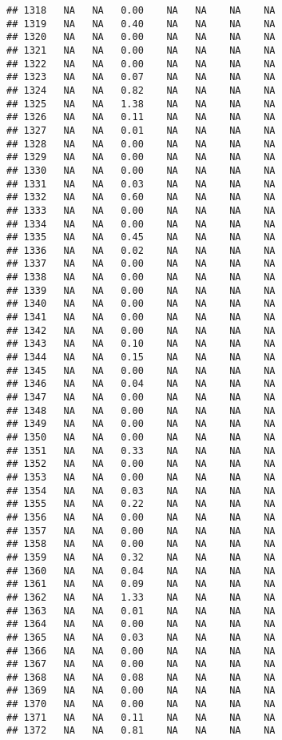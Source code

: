 \documentclass{article}\usepackage{graphicx, color}
\makeatletter
\newenvironment{kframe}{%
 \def\at@end@of@kframe{}%
 \ifinner\ifhmode%
  \def\at@end@of@kframe{\end{minipage}}%
  \begin{minipage}{\columnwidth}%
 \fi\fi%
 \def\FrameCommand##1{\hskip\@totalleftmargin \hskip-\fboxsep
 \colorbox{shadecolor}{##1}\hskip-\fboxsep
     \hskip-\linewidth \hskip-\@totalleftmargin \hskip\columnwidth}%
 \MakeFramed {\advance\hsize-\width
   \@totalleftmargin\z@ \linewidth\hsize
   \@setminipage}}%
 {\par\unskip\endMakeFramed%
 \at@end@of@kframe}
\newenvironment{knitrout}{}{} %
\makeatother
\begin{document}
\begin{knitrout}
\begin{kframe}
\begin{verbatim}
## 1318   NA   NA   0.00    NA   NA    NA    NA
## 1319   NA   NA   0.40    NA   NA    NA    NA
## 1320   NA   NA   0.00    NA   NA    NA    NA
## 1321   NA   NA   0.00    NA   NA    NA    NA
## 1322   NA   NA   0.00    NA   NA    NA    NA
## 1323   NA   NA   0.07    NA   NA    NA    NA
## 1324   NA   NA   0.82    NA   NA    NA    NA
## 1325   NA   NA   1.38    NA   NA    NA    NA
## 1326   NA   NA   0.11    NA   NA    NA    NA
## 1327   NA   NA   0.01    NA   NA    NA    NA
## 1328   NA   NA   0.00    NA   NA    NA    NA
## 1329   NA   NA   0.00    NA   NA    NA    NA
## 1330   NA   NA   0.00    NA   NA    NA    NA
## 1331   NA   NA   0.03    NA   NA    NA    NA
## 1332   NA   NA   0.60    NA   NA    NA    NA
## 1333   NA   NA   0.00    NA   NA    NA    NA
## 1334   NA   NA   0.00    NA   NA    NA    NA
## 1335   NA   NA   0.45    NA   NA    NA    NA
## 1336   NA   NA   0.02    NA   NA    NA    NA
## 1337   NA   NA   0.00    NA   NA    NA    NA
## 1338   NA   NA   0.00    NA   NA    NA    NA
## 1339   NA   NA   0.00    NA   NA    NA    NA
## 1340   NA   NA   0.00    NA   NA    NA    NA
## 1341   NA   NA   0.00    NA   NA    NA    NA
## 1342   NA   NA   0.00    NA   NA    NA    NA
## 1343   NA   NA   0.10    NA   NA    NA    NA
## 1344   NA   NA   0.15    NA   NA    NA    NA
## 1345   NA   NA   0.00    NA   NA    NA    NA
## 1346   NA   NA   0.04    NA   NA    NA    NA
## 1347   NA   NA   0.00    NA   NA    NA    NA
## 1348   NA   NA   0.00    NA   NA    NA    NA
## 1349   NA   NA   0.00    NA   NA    NA    NA
## 1350   NA   NA   0.00    NA   NA    NA    NA
## 1351   NA   NA   0.33    NA   NA    NA    NA
## 1352   NA   NA   0.00    NA   NA    NA    NA
## 1353   NA   NA   0.00    NA   NA    NA    NA
## 1354   NA   NA   0.03    NA   NA    NA    NA
## 1355   NA   NA   0.22    NA   NA    NA    NA
## 1356   NA   NA   0.00    NA   NA    NA    NA
## 1357   NA   NA   0.00    NA   NA    NA    NA
## 1358   NA   NA   0.00    NA   NA    NA    NA
## 1359   NA   NA   0.32    NA   NA    NA    NA
## 1360   NA   NA   0.04    NA   NA    NA    NA
## 1361   NA   NA   0.09    NA   NA    NA    NA
## 1362   NA   NA   1.33    NA   NA    NA    NA
## 1363   NA   NA   0.01    NA   NA    NA    NA
## 1364   NA   NA   0.00    NA   NA    NA    NA
## 1365   NA   NA   0.03    NA   NA    NA    NA
## 1366   NA   NA   0.00    NA   NA    NA    NA
## 1367   NA   NA   0.00    NA   NA    NA    NA
## 1368   NA   NA   0.08    NA   NA    NA    NA
## 1369   NA   NA   0.00    NA   NA    NA    NA
## 1370   NA   NA   0.00    NA   NA    NA    NA
## 1371   NA   NA   0.11    NA   NA    NA    NA
## 1372   NA   NA   0.81    NA   NA    NA    NA

\end{verbatim}
\end{kframe}
\end{knitrout}
\end{document}
